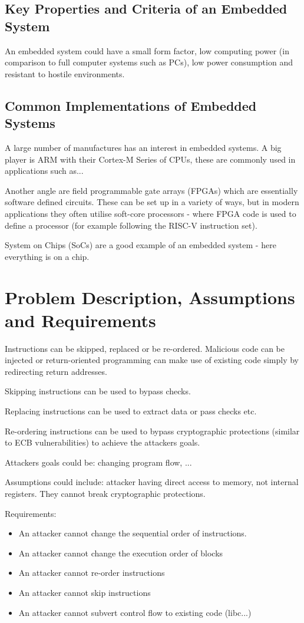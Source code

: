 \subsection{Key Properties and Criteria of an Embedded System}\label{propertiesEmbeddedSystems}
An embedded system could have a small form factor, low computing power (in comparison to full computer systems such as PCs), low power consumption and resistant to hostile environments.

\subsection{Common Implementations of Embedded Systems}\label{implementationsEmbeddedSystems}
A large number of manufactures has an interest in embedded systems. A big player is ARM with their Cortex-M Series of CPUs, these are commonly used in applications such as...

Another angle are field programmable gate arrays (FPGAs) which are essentially software defined circuits. These can be set up in a variety of ways, but in modern applications they often utilise soft-core processors - where FPGA code is used to define a processor (for example following the RISC-V instruction set).

System on Chips (SoCs) are a good example of an embedded system - here everything is on a chip.

\section{Problem Description, Assumptions and Requirements}

Instructions can be skipped, replaced or be re-ordered. Malicious code can be injected or return-oriented programming can make use of existing code simply by redirecting return addresses. 

Skipping instructions can be used to bypass checks.

Replacing instructions can be used to extract data or pass checks etc.

Re-ordering instructions can be used to bypass cryptographic protections (similar to ECB vulnerabilities) to achieve the attackers goals.

Attackers goals could be: changing program flow, ...

Assumptions could include: attacker having direct access to memory, not internal registers. They cannot break cryptographic protections.

Requirements: 
\begin{itemize}
	\item An attacker cannot change the sequential order of instructions.
	\item An attacker cannot change the execution order of blocks
	\item An attacker cannot re-order instructions
	\item An attacker cannot skip instructions
	\item An attacker cannot subvert control flow to existing code (libc...)
\end{itemize}

